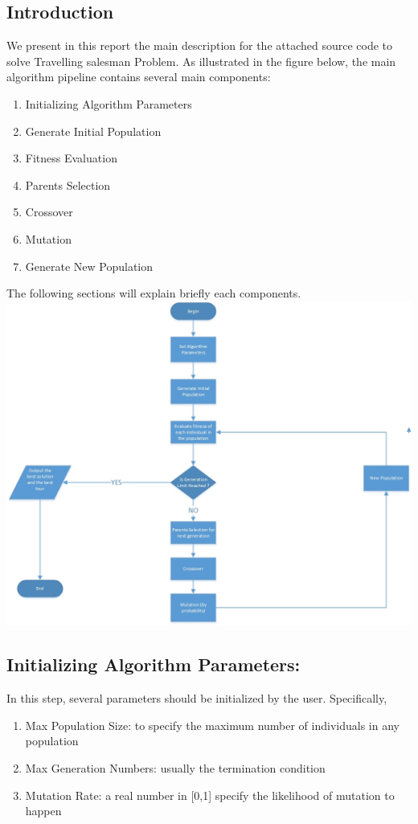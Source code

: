 \documentclass[14pt, english]{article}
\begin{document}
\subsection{Introduction}
We present in this report the main description for the attached source code to solve Travelling salesman Problem. \newline \newline
As illustrated in the figure below, the main algorithm pipeline contains several main components:
\begin{enumerate}
    \item Initializing Algorithm Parameters
    \item Generate Initial Population
    \item Fitness Evaluation
    \item Parents Selection
    \item Crossover
    \item Mutation
    \item Generate New Population
\end{enumerate}
The following sections will explain briefly each components.
\newline \newline
\includegraphics[width=\textwidth]{tsp-genetic-flowchart.jpg}

\subsection{Initializing Algorithm Parameters:}
In this step, several parameters should be initialized by the user. Specifically, \begin{enumerate}
    \item Max Population Size: 
    to specify the maximum number of individuals in any population
    \item Max Generation Numbers: usually the termination condition
    \item Mutation Rate: a real number in [0,1] specify the likelihood of mutation to happen
\end{enumerate}
\end{document}

